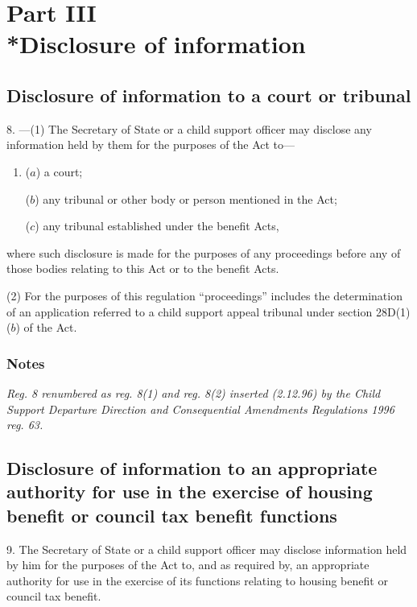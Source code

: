\documentclass[a4paper]{article}
\newcommand{\parthead}{}
\newcommand\amendment[1]{\subsubsection*{Notes}{\itshape\frenchspacing\footnotesize #1 \par}}
\begin{document}
\section[Part III --- Disclosure of information]{Part III\\*Disclosure of information}

\renewcommand\parthead{--- Part III}

\subsection[8. Disclosure of information to a court or tribunal]{Disclosure of information to a court or tribunal}

8.%
---(1)  %
  The Secretary of State or a child support officer may disclose any information held by them for the purposes of the Act to—
\begin{enumerate}\item[]
($a$) a court;

($b$) any tribunal or other body or person mentioned in the Act;

($c$) any tribunal established under the benefit Acts,
\end{enumerate}
where such disclosure is made for the purposes of any proceedings before any of those bodies relating to this Act or to the benefit Acts.

(2) For the purposes of this regulation “proceedings” includes the determination of an application referred to a child support appeal tribunal under section 28D(1)($b$) of the Act.

\amendment{
Reg. 8 renumbered as reg. 8(1) and reg. 8(2) inserted (2.12.96) by the Child Support Departure Direction and Consequential Amendments Regulations 1996 reg. 63.
}

\subsection[9. Disclosure of information to an appropriate authority for use in the exercise of housing benefit or council tax benefit functions]{Disclosure of information to an appropriate authority for use in the exercise of housing benefit or council tax benefit functions}

9.  The Secretary of State or a child support officer may disclose information held by him for the purposes of the Act to, and as required by, an appropriate authority for use in the exercise of its functions relating to housing benefit or council tax benefit.
\end{document}
